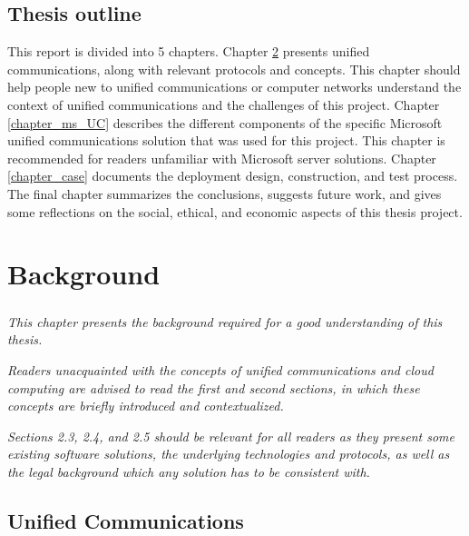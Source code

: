 \section{Thesis outline}
This report is divided into 5 chapters.
Chapter \ref{chapter_background} presents unified communications, along with relevant protocols and concepts. This chapter should help people new to unified communications or computer networks understand the context of unified communications and the challenges of this project.
Chapter \ref{chapter_ms_UC} describes the different components of the specific Microsoft unified communications solution that was used for this project. This chapter is recommended for readers unfamiliar with Microsoft server solutions.
Chapter \ref{chapter_case} documents the deployment design, construction, and test process.
The final chapter summarizes the conclusions, suggests future work, and gives some reflections on the social, ethical, and economic aspects of this thesis project.






\chapter{Background}\label{chapter_background}
\paragraph{}
\textit{This chapter presents the background required for a good understanding of this thesis.}

\textit{Readers unacquainted with the concepts of unified communications and cloud computing are advised to read the first and second sections, in which these concepts are briefly introduced and contextualized.}

\textit{Sections 2.3, 2.4, and 2.5 should be relevant for all readers as they present some existing software solutions, the underlying technologies and protocols, as well as the legal background which any solution has to be consistent with.}


\section{Unified Communications}
\label{background_uc}

